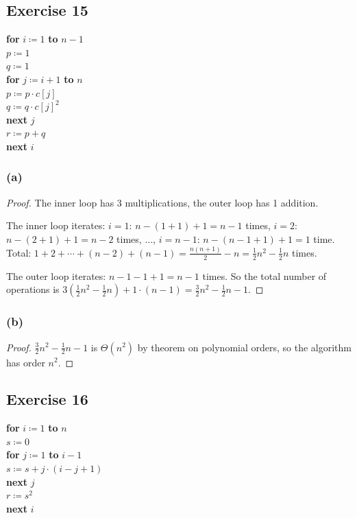 \documentclass[14pt]{extarticle}
\begin{document}
\subsection{Exercise 15}
\begin{tabbing}
{\bf for} \= \(i \coloneqq 1\) {\bf to} \(n-1\) \\
          \> \(p \coloneqq 1\) \\ 
          \> \(q \coloneqq 1\) \\ 
          \> {\bf for} \= \(j \coloneqq i+1\) {\bf to} \(n\)\\
          \>           \> \(p \coloneqq p \cdot c[j]\) \\
          \>           \> \(q \coloneqq q \cdot c[j]^2\) \\
          \> {\bf next} \(j\) \\
          \> \(r \coloneqq p + q\) \\
{\bf next} \(i\)
\end{tabbing}

\subsubsection{(a)}
\begin{proof}
The inner loop has 3 multiplications, the outer loop has 1 addition.

The inner loop iterates: \(i=1\): \(n-(1+1)+1 = n-1\) times, \(i=2\): \(n-(2+1)+1 = n-2\) times, \(\ldots\), \(i = n-1\):
\(n-(n-1+1)+1 = 1\) time. Total: \(1+2+\cdots+(n-2)+(n-1) = \frac{n(n+1)}{2}-n = \frac{1}{2}n^2 - \frac{1}{2}n\) times.

The outer loop iterates: \(n-1-1+1 = n-1\) times. So the total number of operations is \(3\left(\frac{1}{2}n^2-\frac{1}{2}
n\right) + 1 \cdot (n-1) = \frac{3}{2}n^2 - \frac{1}{2}n -1\).
\end{proof}

\subsubsection{(b)}
\begin{proof}
\(\frac{3}{2}n^2 - \frac{1}{2}n - 1\) is \(\Theta(n^2)\) by theorem on polynomial orders, so the algorithm has order 
\(n^2\).
\end{proof}

\subsection{Exercise 16}
\begin{tabbing}
{\bf for} \= \(i \coloneqq 1\) {\bf to} \(n\) \\
          \> \(s \coloneqq 0\) \\ 
          \> {\bf for} \= \(j \coloneqq 1\) {\bf to} \(i-1\)\\
          \>           \> \(s \coloneqq s + j\cdot (i-j+1)\)\\
          \> {\bf next} \(j\) \\
          \> \(r \coloneqq s^2\) \\
{\bf next} \(i\)
\end{tabbing}
\end{document}
